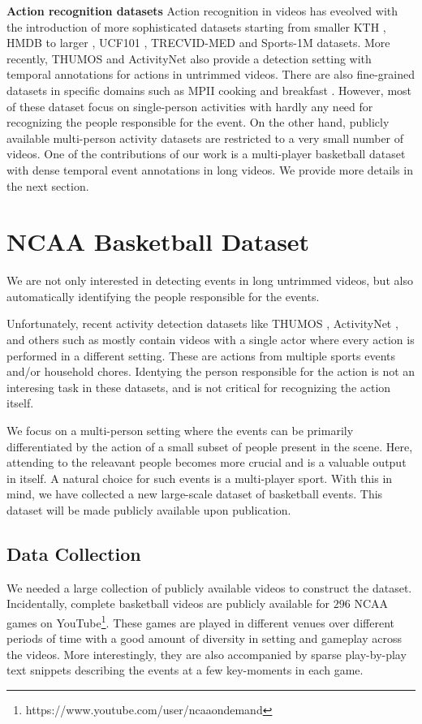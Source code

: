 \documentclass[10pt,twocolumn,letterpaper]{article}
\begin{document}
\noindent \textbf{Action recognition datasets}
Action recognition in videos has eveolved with the introduction of more
sophisticated datasets starting from smaller KTH \cite{KTH}, HMDB \cite{HMDB}
to larger , UCF101 \cite{UCF101}, TRECVID-MED \cite{MED11} and Sports-1M \cite{Karpathy_CVPR14}
datasets.
More recently, THUMOS \cite{THUMOS} and ActivityNet \cite{ActivityNet} also provide a detection
setting with temporal annotations for actions in untrimmed videos.
There are also fine-grained datasets
in specific domains such as MPII cooking \cite{Finegrained_cooking} and breakfast \cite{Breakfast}.
However, most of these dataset focus on single-person activities with hardly
any need for recognizing the people responsible for the event. On the other
hand, publicly available multi-person activity datasets \cite{Choi_ICCV09,Ryoo_10} are restricted
to a very small number of videos.  One of the contributions of our work is 
a multi-player basketball dataset with dense temporal event annotations in
long videos. We provide more details in the next section.

\section{NCAA Basketball Dataset}
We are not only interested in detecting events in long untrimmed videos, but
also automatically identifying the people responsible for the events.

Unfortunately, recent activity detection datasets like THUMOS \cite{THUMOS},
ActivityNet \cite{ActivityNet}, and others such as
\cite{UCF101,Finegrained_cooking} mostly contain videos with a single actor
where every action is performed in a different setting. These are actions from
multiple sports events and/or household chores.  Identying the person
responsible for the action is not an interesing task in these datasets, and is
not critical for recognizing the action itself.

We focus on a multi-person setting where the events can be primarily
differentiated by the action of a small subset of people present in the scene.
Here, attending to the releavant people becomes more crucial and is a valuable
output in itself. A natural choice for such events is a multi-player sport.
With this in mind, we have collected a new large-scale dataset of basketball
events. This dataset will be made publicly available upon publication.

\subsection{Data Collection}
We needed a large collection of publicly available videos to construct the dataset.
Incidentally, complete basketball videos are
publicly available for $296$ NCAA games on
YouTube\footnote{https://www.youtube.com/user/ncaaondemand}.  These games are
played in different venues over different periods of time with a good amount of
diversity in setting and gameplay across the videos. More interestingly, they
are also accompanied by sparse play-by-play text snippets describing the events
at a few key-moments in each game.
\end{document}
